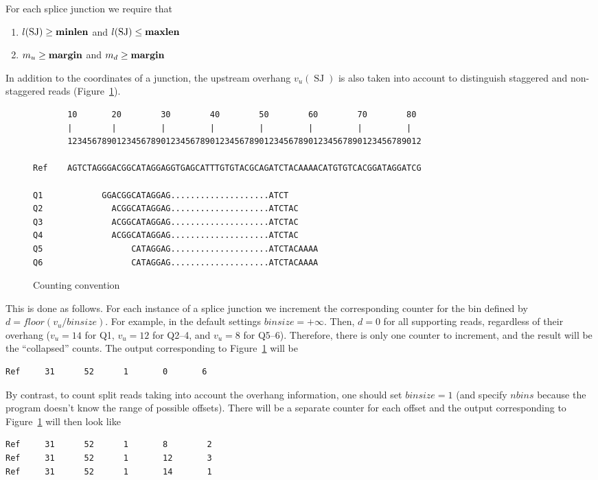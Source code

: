 \documentclass{article}
\DeclareMathOperator{\SJ}{SJ}
\begin{document}
For each splice junction we require that
\begin{enumerate}
\item $l(\SJ)\ge \rm\bf minlen$ and $l(\SJ)\le \rm\bf maxlen$
\item $m_u\ge \rm\bf margin$ and $m_d\ge \rm\bf margin$
\end{enumerate}

In addition to the coordinates of a junction, the upstream overhang $v_u(\SJ)$ is also taken into account to 
distinguish staggered and non-staggered reads (Figure~\ref{fig::02}).
%
\begin{figure}[h]
\footnotesize
\begin{verbatim}
       10       20        30        40        50        60        70        80
       |        |         |         |         |         |         |         |
       123456789012345678901234567890123456789012345678901234567890123456789012

Ref    AGTCTAGGGACGGCATAGGAGGTGAGCATTTGTGTACGCAGATCTACAAAACATGTGTCACGGATAGGATCG

Q1            GGACGGCATAGGAG....................ATCT      
Q2              ACGGCATAGGAG....................ATCTAC    
Q3              ACGGCATAGGAG....................ATCTAC    
Q4              ACGGCATAGGAG....................ATCTAC    
Q5                  CATAGGAG....................ATCTACAAAA
Q6                  CATAGGAG....................ATCTACAAAA
\end{verbatim}
\caption{Counting convention\label{fig::02}}
\end{figure}
%

This is done as follows. For each instance of a splice junction we increment the corresponding counter for the
bin defined by $d=floor(v_u/binsize)$. For example, in the default settings $binsize=+\infty$. Then, $d=0$
for all supporting reads, regardless of their overhang ($v_u=14$ for Q1, $v_u=12$ for Q2--4, and $v_u=8$ for Q5--6). 
Therefore, there is only one counter to increment, and the result will be the ``collapsed'' counts. The output 
corresponding to Figure~\ref{fig::02} will be
\begin{verbatim}
Ref     31      52      1       0       6
\end{verbatim}

By contrast, to count split reads taking into account the overhang information, one should set $binsize=1$ 
(and specify $nbins$ because the program doesn't know the range of possible offsets). There will be a separate 
counter for each offset and the output corresponding to Figure~\ref{fig::02} will then look like
\begin{verbatim}
Ref     31      52      1       8        2
Ref     31      52      1       12       3
Ref     31      52      1       14       1
\end{verbatim}
\end{document}
